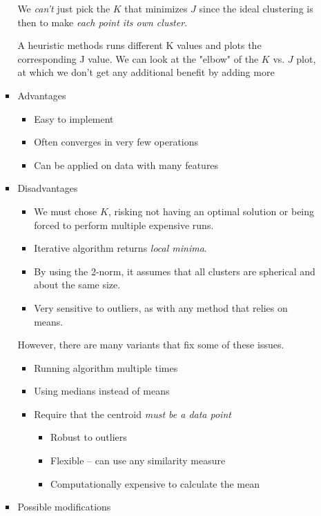 \documentclass[11pt]{article}
\begin{document}
\begin{itemize}
\begin{itemize}
\begin{itemize}
We \emph{can't} just pick the $K$ that minimizes $J$ since the ideal clustering is then to make \emph{each point its own cluster}.

A heuristic methods runs different K values and plots the corresponding J value. We can look at the "elbow" of the $K$ vs. $J$ plot, at which we don't get any additional benefit by adding more 

\item Advantages
\label{sec-2-2-1-3-4}

\begin{itemize}
\item Easy to implement
\item Often converges in very few operations
\item Can be applied on data with many features
\end{itemize}

\item Disadvantages
\label{sec-2-2-1-3-5}

\begin{itemize}
\item We must chose $K$, risking not having an optimal solution or being forced to perform multiple expensive runs.
\item Iterative algorithm returns \emph{local minima}.
\item By using the 2-norm, it assumes that all clusters are spherical and about the same size.
\item Very sensitive to outliers, as with any method that relies on means.
\end{itemize}

However, there are many variants that fix some of these issues.
\begin{itemize}
\item Running algorithm multiple times
\item Using medians instead of means
\item Require that the centroid \emph{must be a data point}
\begin{itemize}
\item Robust to outliers
\item Flexible -- can use any similarity measure
\item Computationally expensive to calculate the mean
\end{itemize}
\end{itemize}

\item Possible modifications
\label{sec-2-2-1-3-6}


\end{itemize}
\end{itemize}
\end{itemize}
\end{document}
